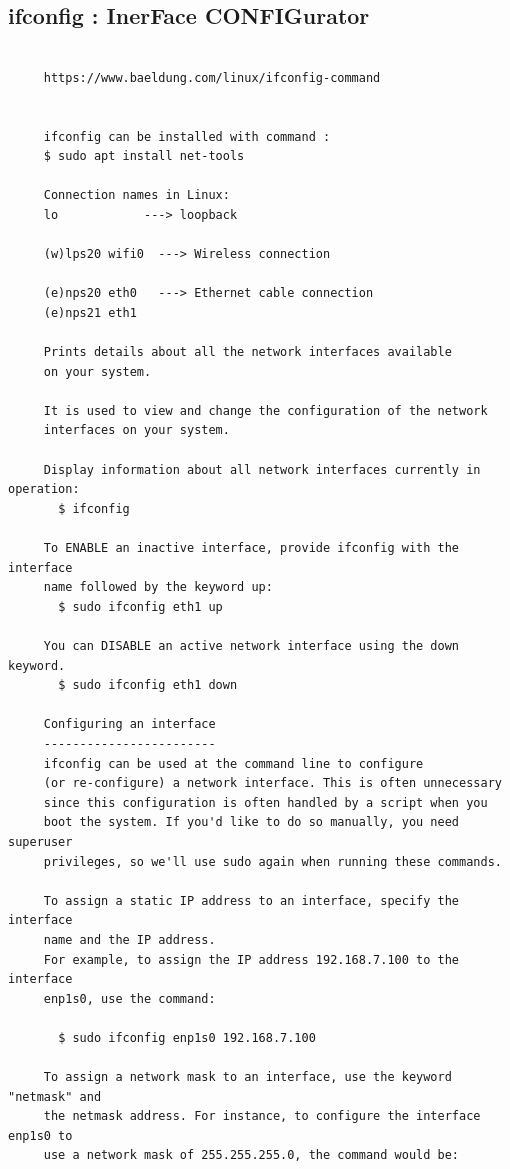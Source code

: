 \documentclass[a4paper,12pt]{article}
\begin{document}
\subsection{ifconfig : InerFace CONFIGurator }
\begin{verbatim}
     
     https://www.baeldung.com/linux/ifconfig-command
     
     
     ifconfig can be installed with command : 
     $ sudo apt install net-tools
     
     Connection names in Linux: 
     lo            ---> loopback
     
     (w)lps20 wifi0  ---> Wireless connection
     
     (e)nps20 eth0   ---> Ethernet cable connection 
     (e)nps21 eth1   
     
     Prints details about all the network interfaces available
     on your system.
     
     It is used to view and change the configuration of the network
     interfaces on your system.
     
     Display information about all network interfaces currently in operation:
       $ ifconfig
     
     To ENABLE an inactive interface, provide ifconfig with the interface
     name followed by the keyword up:
       $ sudo ifconfig eth1 up
     
     You can DISABLE an active network interface using the down keyword.
       $ sudo ifconfig eth1 down
       
     Configuring an interface
     ------------------------
     ifconfig can be used at the command line to configure 
     (or re-configure) a network interface. This is often unnecessary 
     since this configuration is often handled by a script when you
     boot the system. If you'd like to do so manually, you need superuser 
     privileges, so we'll use sudo again when running these commands. 
     
     To assign a static IP address to an interface, specify the interface 
     name and the IP address. 
     For example, to assign the IP address 192.168.7.100 to the interface 
     enp1s0, use the command:
       
       $ sudo ifconfig enp1s0 192.168.7.100
     
     To assign a network mask to an interface, use the keyword "netmask" and 
     the netmask address. For instance, to configure the interface enp1s0 to 
     use a network mask of 255.255.255.0, the command would be:     
       

\end{verbatim}
\end{document}
